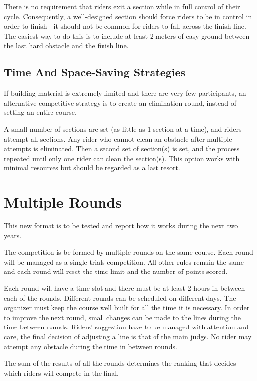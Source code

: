 There is no requirement that riders exit a section while in full control of their cycle. 
Consequently, a well-designed section should force riders to be in control in order to finish---it should not be common for riders to fall across the finish line. 
The easiest way to do this is to include at least 2 meters of easy ground between the last hard obstacle and the finish line.

\subsection{Time And Space-Saving Strategies}
If building material is extremely limited and there are very few participants, an alternative competitive strategy is to create an elimination round, instead of setting an entire course.

A small number of sections are set (as little as 1 section at a time), and riders attempt all sections. 
Any rider who cannot clean an obstacle after multiple attempts is eliminated. 
Then a second set of section(s) is set, and the process repeated until only one rider can clean the section(s). 
This option works with minimal resources but should be regarded as a last resort.

\section{Multiple Rounds}
This new format is to be tested and report how it works during the next two years.

The competition is be formed by multiple rounds on the same course. 
Each round will be managed as a single trials competition. 
All other rules remain the same and each round will reset the time limit and the number of points scored. 

Each round will have a time slot and there must be at least 2 hours in between each of the rounds. 
Different rounds can be scheduled on different days.
The organizer must keep the course well built for all the time it is necessary. 
In order to improve the next round, small changes can be made to the lines during the time between rounds. 
Riders' suggestion have to be managed with attention and care, the final decision of adjusting a line is that of the main judge. 
No rider may attempt any obstacle during the time in between rounds.

The sum of the results of all the rounds determines the ranking that decides which riders will compete in the final.


